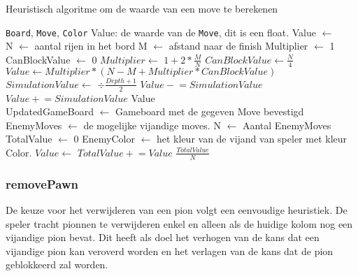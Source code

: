 \documentclass{article}
\makeatletter
\newenvironment{algoritme}[1][H]{%
	\renewcommand{\ALG@name}{Algoritme}%
	\renewcommand{\algorithmicrequire}{\textbf{Input:}}
	\renewcommand{\algorithmicensure}{\textbf{Output:}}
	\begin{algorithm}[#1]%
	}{\end{algorithm}}
\newcommand{\pluseq}{\mathrel{+}=}
\newcommand{\mineq}{\mathrel{-}=}
\makeatother
\begin{document}
\begin{algoritme}
	\caption{Heuristisch algoritme om de waarde van een move te berekenen}
	\label{alg:calculateMove}
	\begin{algorithmic}[1]
		\Require \texttt{Board}, \texttt{Move}, \texttt{Color}
		\Ensure Value: de waarde van de \texttt{Move}, dit is een float.
		\State Value $\gets$ 
		\\
			\State N $\gets$ aantal rijen in het bord 
			\State M $\gets$ afstand naar de finish
			\State Multiplier $\gets$ 1 
			\State CanBlockValue $\gets$ 0
				\State $Multiplier \gets$ $1 + 2*\frac{M}{N}$\label{alg:setmultiplier}
			\EndIf
				\State $CanBlockValue \gets \frac{N}{4}$\label{alg:canblock}
			\EndIf
			\State $Value \gets Multiplier*(N-M+Multiplier*CanBlockValue)$\label{alg:calcval}
				\State $SimulationValue \gets$ $\div\frac{Depth+1}{2}$\label{alg:simulate}
					\State $Value \mineq SimulationValue$
				\Else
					\State $Value \pluseq SimulationValue$
				\EndIf
			\EndIf
			\State \Return Value
		\EndFunction 
		\\
			\State UpdatedGameBoard $\gets$ Gameboard met de gegeven Move bevestigd 
			\State EnemyMoves $\gets$ de mogelijke vijandige moves.
			\State N $\gets$ Aantal EnemyMoves 
			\State TotalValue $\gets$ 0 
			\State EnemyColor $\gets$ het kleur van de vijand van speler met kleur Color.
				\State $Value \gets$ 
				\State $TotalValue \pluseq Value$ 
			\EndFor
			\State \Return $\frac{TotalValue}{N}$
		\EndFunction
	\end{algorithmic}
\end{algoritme}

\subsubsection{removePawn}
De keuze voor het verwijderen van een pion volgt een eenvoudige heuristiek. De speler tracht pionnen te verwijderen enkel en alleen als de huidige kolom nog een vijandige pion bevat. Dit heeft als doel het verhogen van de kans dat een vijandige pion kan veroverd worden en het verlagen van de kans dat de pion geblokkeerd zal worden. 
\end{document}
